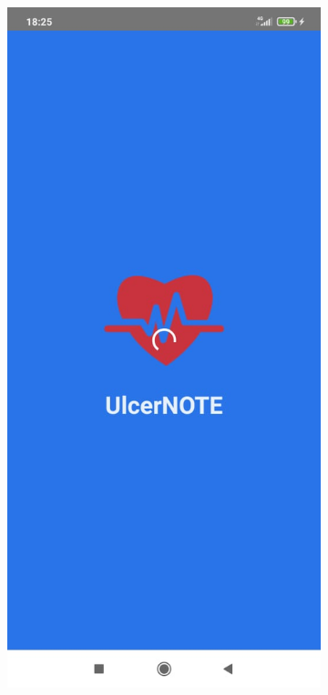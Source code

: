 \begin{figure}
    \centering
    \begin{subfigure}[b]{0.125\textwidth}
        \includegraphics[width=\textwidth]{figs/mobapp/img1.jpeg}

\end{subfigure}
\end{figure}
